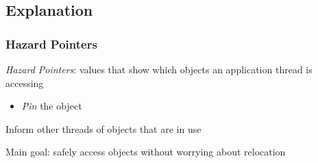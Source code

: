 \documentclass{beamer}
\newcommand{\linespace}{\vskip 0.25cm}
\begin{document}
\subsection*{Explanation}

\begin{frame}

\frametitle{Hazard Pointers}

\emph{Hazard Pointers}: values that show which objects an application thread is accessing
\begin{itemize}
\item \emph{Pin} the object
\end{itemize}

\linespace
\linespace

Inform other threads of objects that are in use

\linespace
\linespace

Main goal: safely access objects without worrying about relocation



\end{frame}
\end{document}
